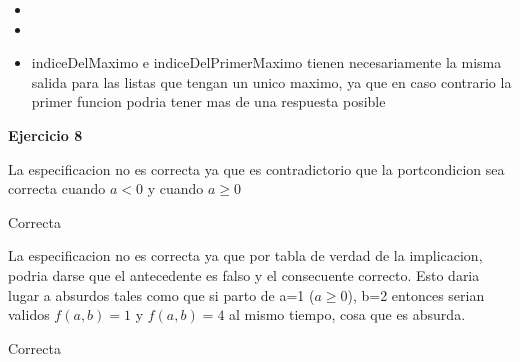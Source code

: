 \documentclass{article}
\begin{document}
\begin{itemize}
    \item [a) ]
    \item [b) ]
    \item[c) ] \Large{indiceDelMaximo e indiceDelPrimerMaximo tienen necesariamente la misma salida para las listas que tengan un unico maximo, ya que en caso contrario la primer funcion podria tener mas de una respuesta posible}\\
\end{itemize}
\LARGE{\textbf{Ejercicio 8}}\\
\begin{itemize} \Large{
    \item [a) ] La especificacion no es correcta ya que es contradictorio que la portcondicion sea correcta cuando $a<0$ y cuando $a\geq0$
    \item [b) ] Correcta
    \item [c) ] La especificacion no es correcta ya que por tabla de verdad de la implicacion, podria darse que el antecedente es falso y el consecuente correcto. Esto daria lugar a absurdos tales como que si parto de a=1 ($a\geq0$), b=2 entonces serian validos $f(a,b)=1$ y $f(a,b)=4$ al mismo tiempo, cosa que es absurda.
    \item [d) ] Correcta}\\
\end{itemize}
\end{document}
